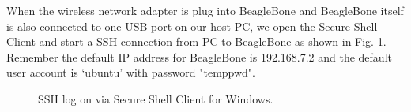 \documentclass[12pt,journal,draftclsnofoot,onecolumn]{IEEEtran}
\begin{document}
When the wireless network adapter is plug into BeagleBone and BeagleBone itself is also connected to one USB port on our host PC, we open the Secure Shell Client and start a SSH connection from PC to BeagleBone as shown in Fig. \ref{ssh}. Remember the default IP address for BeagleBone is 192.168.7.2 and the default user account is `ubuntu' with password "temppwd".
\begin{figure}[htb]
	\centering

     \caption{SSH log on via Secure Shell Client for Windows.}\label{ssh}
     \end{figure}
     
\end{document}
